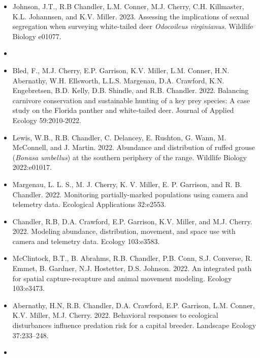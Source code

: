 \documentclass[12pt]{article}
\begin{document}
\begin{itemize}
\item Johnson, J.T., R.B Chandler, L.M. Conner, M.J. Cherry,
  C.H. Killmaster, K.L. Johannsen, and K.V. Miller. 2023. Assessing
  the implications of sexual segregation when surveying white-tailed
  deer {\it Odocoileus virginianus}. Wildlife Biology e01077. 

  
\item[] { \\}

\item Bled, F., M.J. Cherry, E.P. Garrison, K.V. Miller, L.M. Conner,
  H.N. Abernathy, W.H. Ellsworth, L.L.S. Margenau, D.A. Crawford,
  K.N. Engebretsen, B.D. Kelly, D.B. Shindle, and
  R.B. Chandler. 2022. Balancing carnivore conservation and
  sustainable hunting of a  key prey species: A case study on the
  Florida panther and white‐tailed deer. Journal of Applied Ecology
  59:2010-2022. 
  
\item Lewis, W.B., R.B. Chandler, C. Delancey, E. Rushton, G. Wann, M.
  McConnell, and J. Martin. 2022. Abundance and distribution of
  ruffed grouse ({{\it Bonasa umbellus}}) at the southern periphery of
  the range. Wildlife Biology 2022:e01017. 

\item Margenau, L. L. S., M. J. Cherry, K. V. Miller, E. P. Garrison,
  and R. B. Chandler. 2022. Monitoring partially-marked
  populations using camera and telemetry data. Ecological
  Applications 32:e2553. 

\item Chandler, R.B, D.A. Crawford, E.P. Garrison, K.V. Miller, and
  M.J. Cherry. 2022. Modeling abundance, distribution, movement,
  and space use with camera and telemetry data. Ecology 103:e3583.  

\item McClintock, B.T., B. Abrahms, R.B. Chandler, P.B. Conn,
  S.J. Converse, R. Emmet, B. Gardner, N.J. Hostetter,
  D.S. Johnson. 2022. An integrated path for spatial
  capture-recapture and animal movement modeling. Ecology 103:e3473. 

\item Abernathy, H.N, R.B. Chandler, D.A. Crawford, E.P. Garrison,
  L.M. Conner, K.V. Miller, M.J. Cherry. 2022. Behavioral
  responses to ecological disturbances influence predation risk for a
  capital breeder. Landscape Ecology 37:233--248.

\item[] { \\}


\end{itemize}
\end{document}
